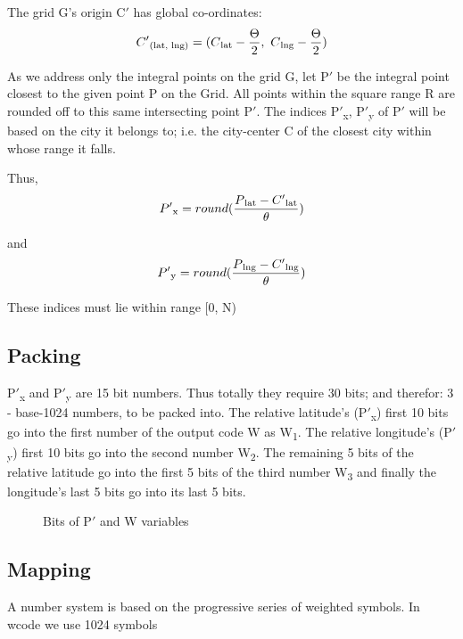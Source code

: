 \documentclass[conference]{IEEEtran}
\begin{document}
The grid G's origin C$'$ has global co-ordinates:
\begin{equation}C'\textsubscript{(lat, lng)} = ( C\textsubscript{lat} - \frac{\Theta}{2},\ C\textsubscript{lng} - \frac{\Theta}{2})\end{equation}

As we address only the integral points on the grid G, let P$'$ be the integral point closest to the given point P on the Grid.
All points within the square range R are rounded off to this same intersecting point P$'$.
The indices P$'$\textsubscript{x}, P$'$\textsubscript{y} of P$'$ will be based on the city it belongs to;
i.e. the city-center C of the closest city within whose range it falls.


Thus, \begin{equation}P'\textsubscript{x} = round(\frac{P\textsubscript{lat} - C'\textsubscript{lat}} {\theta})\end{equation}

and \begin{equation}P'\textsubscript{y}= round(\frac{P\textsubscript{lng} - C'\textsubscript{lng}} {\theta})\end{equation}

These indices must lie within range [0, N)

\subsection{Packing}
P$'$\textsubscript{x} and P$'$\textsubscript{y} are 15 bit numbers.
Thus totally they require 30 bits; and therefor: 3 - base-1024 numbers, to be packed into.
The relative latitude's (P$'$\textsubscript{x}) first 10 bits go into the first number of the output code W as W\textsubscript{1}. The relative longitude's (P$'$\textsubscript{y}) first 10 bits go into the second number W\textsubscript{2}. The remaining 5 bits of the relative latitude go into the first 5 bits of the third number W\textsubscript{3} and finally the longitude's last 5 bits go into its last 5 bits.
\begin{figure}[H]
\centerline{}
\caption{Bits of P$'$ and W variables}
\label{Packing}
\end{figure}

\subsection{Mapping}

A number system is based on the progressive series of weighted symbols.
In wcode we use 1024 symbols
\end{document}
